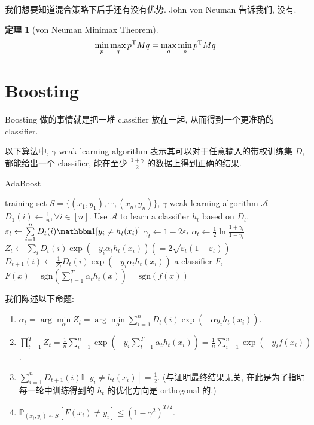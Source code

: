 \documentclass[8pt]{article}
\theoremstyle{compact}
\newtheorem{theorem}{定理}[section]
\def\le{\leqslant}
\def\ge{\geqslant}
\begin{document}
我们想要知道混合策略下后手还有没有优势. John von Neuman 告诉我们, 没有.

\begin{theorem}[von Neuman Minimax Theorem]
	$$\min_{ p}\max_{ q}  p^{\text T}M q = \max_{ q}\min_{ p}  p^{\text T}M q$$
	\label{minimax}
\end{theorem}

\newpage
\section{Boosting}

Boosting 做的事情就是把一堆 classifier 放在一起, 从而得到一个更准确的 classifier.

以下算法中, $\gamma$-weak learning algorithm 表示其可以对于任意输入的带权训练集 $D$, 都能给出一个 classifier, 能在至少 $\frac{1 + \gamma}{2}$ 的数据上得到正确的结果.

\begin{algorithm}
	\caption{AdaBoost}
	\begin{algorithmic}[1]
		\Require training set $S = \{(x_1, y_1), \cdots, (x_n, y_n)\}$, $\gamma$-weak learning algorithm $\mathcal A$
		\State $D_1(i) \gets \frac1n, \forall i \in [n]$.
			\State Use $\mathcal A$ to learn a classifier $h_t$ based on $D_t$.
			\State $\varepsilon_t \gets \sum\limits_{i=1}^{n}D_t(i)\mathbbm 1[y_i \neq h_t(x_i)]$
			\State $\gamma_t \gets 1 - 2\varepsilon_t$ \Comment{$\gamma_t \ge \gamma$}
			\State $\alpha_t \gets \frac12 \ln\frac{1 + \gamma_t}{1 - \gamma_t}$
			\State $Z_t \gets \sum_i D_t(i)\exp(-y_i\alpha_th_t(x_i)) \left(= 2\sqrt{\varepsilon_t (1 - \varepsilon_t)}\right)$
			\State $D_{t + 1}(i) \gets \frac{1}{Z_t}D_t(i)\exp(-y_i\alpha_th_t(x_i))$
		\EndFor
		\State \Return a classifier $F$, $F(x) = \text{sgn}\left(\sum\limits_{t=1}^{T}\alpha_th_t(x)\right) = \text{sgn}(f(x))$
	\end{algorithmic}
\end{algorithm}

我们陈述以下命题:
\begin{enumerate}
	\item $\alpha_t = \arg\min\limits_{\alpha}Z_t = \arg\min\limits_{\alpha} \sum\limits_{i=1}^{n}D_t(i)\exp(-\alpha y_i h_t(x_i))$.
	\item $\prod\limits_{t=1}^{T}Z_t = \frac1n \sum\limits_{i=1}^{n}\exp\left(-y_i\sum\limits_{t=1}^{T}\alpha_t h_t(x_i)\right) = \frac1n \sum\limits_{i=1}^{n}\exp\left(-y_if(x_i)\right)$.
	\item $\sum\limits_{i=1}^{n}D_{t+1}(i)\mathbb I[y_i \neq h_t(x_i)] = \frac12$. (与证明最终结果无关, 在此是为了指明每一轮中训练得到的 $h_t$ 的优化方向是 orthogonal 的.)
	\item $\mathbb P_{(x_i, y_i) \sim S} \left[F(x_i) \neq y_i\right] \le (1 - \gamma^2)^{T/2}$.
\end{enumerate}
\end{document}
